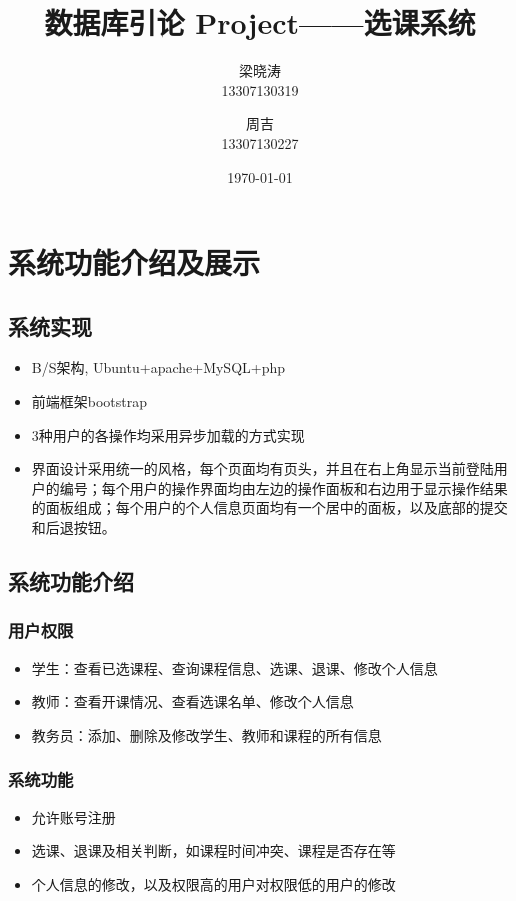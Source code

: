 \documentclass[a4paper, 11pt, nofonts, nocap, fancyhdr]{ctexart}
\title{数据库引论 Project——选课系统}
\author
{
	梁晓涛\\
	13307130319
	\and
	周吉\\
	13307130227
}
\date{\today}
\begin{document}
\maketitle
\tableofcontents
\setcounter{page}{0}
\thispagestyle{empty}
\newpage

\section{系统功能介绍及展示}

\subsection{系统实现}
\begin{itemize}
	\item B/S架构, Ubuntu+apache+MySQL+php
	\item 前端框架bootstrap
	\item 3种用户的各操作均采用异步加载的方式实现
	\item 界面设计采用统一的风格，每个页面均有页头，并且在右上角显示当前登陆用户的编号；每个用户的操作界面均由左边的操作面板和右边用于显示操作结果的面板组成；每个用户的个人信息页面均有一个居中的面板，以及底部的提交和后退按钮。
\end{itemize}

\subsection{系统功能介绍}

\subsubsection{用户权限}
\begin{itemize}
    \item 学生：查看已选课程、查询课程信息、选课、退课、修改个人信息
    \item 教师：查看开课情况、查看选课名单、修改个人信息
    \item 教务员：添加、删除及修改学生、教师和课程的所有信息
\end{itemize}

\subsubsection{系统功能}
\begin{itemize}
    \item 允许账号注册
    \item 选课、退课及相关判断，如课程时间冲突、课程是否存在等
    \item 个人信息的修改，以及权限高的用户对权限低的用户的修改
\end{itemize}
\end{document}
